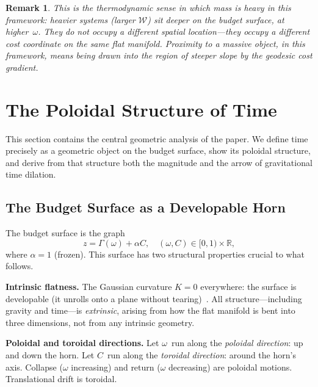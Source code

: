 \documentclass[
  aps,
  prd,
  twocolumn,
  superscriptaddress,
  nofootinbib,
  floatfix
]{revtex4-2}
\newtheorem{remark}{Remark}
\newcommand{\Gam}{\Gamma}
\newcommand{\memwell}{\mathcal{W}}                     %
\begin{document}
\begin{remark}
This is the thermodynamic sense in which mass is \emph{heavy}
in this framework: heavier systems (larger $\memwell$) sit
deeper on the budget surface, at higher~$\omega$.  They do
not occupy a different spatial location---they occupy a
different \emph{cost coordinate} on the same flat manifold.
Proximity to a massive object, in this framework, means
being drawn into the region of steeper slope by the
geodesic cost gradient.
\end{remark}

\section{The Poloidal Structure of Time}\label{sec:poloidal}

This section contains the central geometric analysis of the
paper.  We define time precisely as a geometric object on the
budget surface, show its poloidal structure, and derive from
that structure both the magnitude and the arrow of
gravitational time dilation.

\subsection{The Budget Surface as a Developable Horn}

The budget surface is the graph
\begin{equation}
  z = \Gam(\omega) + \alpha C,
  \quad (\omega, C) \in [0,1) \times \mathbb{R},
  \label{eq:horn}
\end{equation}
where $\alpha = 1$ (frozen).  This surface has two
structural properties crucial to what follows.

\textbf{Intrinsic flatness.}  The Gaussian curvature
$K = 0$ everywhere: the surface is developable (it unrolls
onto a plane without tearing)~\cite{paulus2025physicscoherence}.
All structure---including gravity and time---is \emph{extrinsic},
arising from how the flat manifold is bent into three
dimensions, not from any intrinsic geometry.

\textbf{Poloidal and toroidal directions.}  Let
$\omega$~run along the \emph{poloidal direction}: up and
down the horn.  Let $C$~run along the \emph{toroidal
direction}: around the horn's axis.  Collapse ($\omega$
increasing) and return ($\omega$ decreasing) are poloidal
motions.  Translational drift is toroidal.
\end{document}
